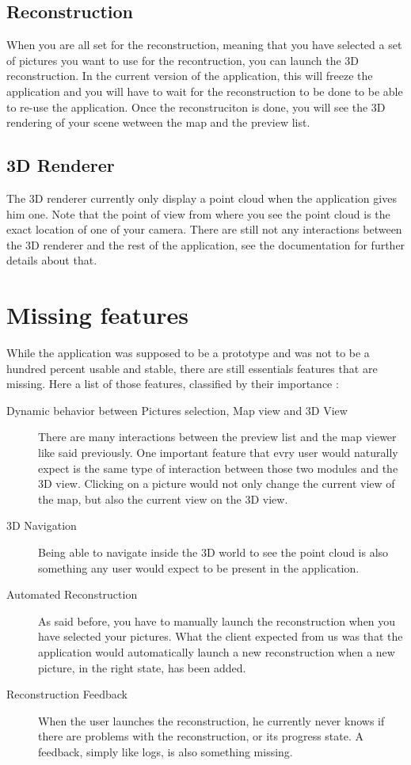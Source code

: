 \subsection*{Reconstruction}
When you are all set for the reconstruction, meaning that you have selected a set of pictures you want to use for the recontruction, you can launch the 3D reconstruction. In the current version of the application,
this will freeze the application and you will have to wait for the reconstruction to be done to be able to re-use the application. Once the reconstruciton is done, you will see the 3D rendering of your scene wetween the map
and the preview list.

\subsection*{3D Renderer}
The 3D renderer currently only display a point cloud when the application gives him one. Note that the point of view from where you see the point cloud is the exact location of one of your camera. There 
are still not any interactions between the 3D renderer and the rest of the application, see the documentation for further details about that.

\section{Missing features}
While the application was supposed to be a prototype and was not to be a hundred percent usable and stable, there are still essentials features that are missing. Here a list of those features, classified by their importance :
\begin{description}
\item[Dynamic behavior between Pictures selection, Map view and 3D View] There are many interactions between the preview list and the map viewer like said previously. One important feature that evry user would naturally
expect is the same type of interaction between those two modules and the 3D view. Clicking on a picture would not only change the current view of the map, but also the current view on the 3D view.
\item[3D Navigation] Being able to navigate inside the 3D world to see the point cloud is also something any user would expect to be present in the application. 
\item[Automated Reconstruction] As said before, you have to manually launch the reconstruction when you have selected your pictures. What the client expected from us was that the application would automatically launch
a new reconstruction when a new picture, in the right state, has been added. 
\item[Reconstruction Feedback] When the user launches the reconstruction, he currently never knows if there are problems with the reconstruction, or its progress state. A feedback, simply like logs, is also something missing.
\end{description}


